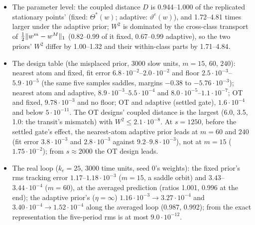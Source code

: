 \begin{itemize}
    at $m=15$, $60$, $240$); at the seven D$'''$.5-admissible samples it is the exact bias at the sampled weights
    (ratio 1.0000), the delta method missing it by 0.86--1.72; the five saddles have split (class diameters
    0.64--1.50) at 0.81--1.01 of the replicated floor. The adaptive prior's decreases without a floor (at $s=6000$ at
    most $2.0\cdot10^{-6}$ at $\eta=\sigma_0$ and $5.4\cdot10^{-8}$ at $\eta=\infty$ over the representable samples);
    the boundary sample decays like $1/s$ ($6000\cdot\norm{\fhat_m-\fhat_M}^2=0.88$ and 0.42 against the predicted 0.8
    and 0.4); the counts are conserved.
  \item The parameter level: the coupled distance $D$ is 0.944--1.000 of the replicated stationary points' (fixed:
    $\Theta^*(w)$; adaptive: $\vartheta^e(w)$), and 1.72--4.81 times larger under the adaptive prior; $W^2$ is
    dominated by the cross-class transport of $\frac12\lVert w^m-w^M\rVert_1$ (0.82--0.99 of it fixed, 0.67--0.99 adaptive),
    so the two priors' $W^2$ differ by 1.00--1.32 and their within-class parts by 1.71--4.84.
  \item The design table (the misplaced prior, 3000 slow units, $m=15$, $60$, $240$): nearest atom and fixed, fit
    error $6.8\cdot10^{-2}$--$2.0\cdot10^{-2}$ and floor $2.5\cdot10^{-3}$--$5.9\cdot10^{-5}$ (the same five samples
    saddles, margins $-0.38$ to $-5.76\cdot10^{-3}$); nearest atom and adaptive, $8.9\cdot10^{-3}$--$5.5\cdot10^{-4}$
    and $8.0\cdot10^{-5}$--$1.1\cdot10^{-7}$; OT and fixed, $9.78\cdot10^{-3}$ and no floor; OT and adaptive (settled
    gate), $1.6\cdot10^{-4}$ and below $5\cdot10^{-11}$. The OT designs' coupled distance is the largest (6.0, 3.5,
    1.0: the transit's mismatch) with $W^2\le2.1\cdot10^{-8}$. At $s=1250$, before the settled gate's effect, the
    nearest-atom adaptive prior leads at $m=60$ and $240$ (fit error $3.8\cdot10^{-3}$ and $2.8\cdot10^{-3}$ against
    $9.2$--$9.8\cdot10^{-3}$), not at $m=15$ ($1.75\cdot10^{-2}$); from $s\approx2000$ the OT design leads.
  \item The real loop ($k_e=25$, 3000 time units, seed 0's weights): the fixed prior's rms tracking error
    $1.17$--$1.18\cdot10^{-3}$ ($m=15$, a saddle orbit) and $3.43$--$3.44\cdot10^{-4}$ ($m=60$), at the averaged
    prediction (ratios 1.001, 0.996 at the end); the adaptive prior's ($\eta=\infty$)
    $1.16\cdot10^{-3}\to3.27\cdot10^{-4}$ and $3.40\cdot10^{-4}\to1.52\cdot10^{-4}$ along the averaged loop (0.987,
    0.992); from the exact representation the five-period rms is at most $9.0\cdot10^{-12}$.

\end{itemize}
